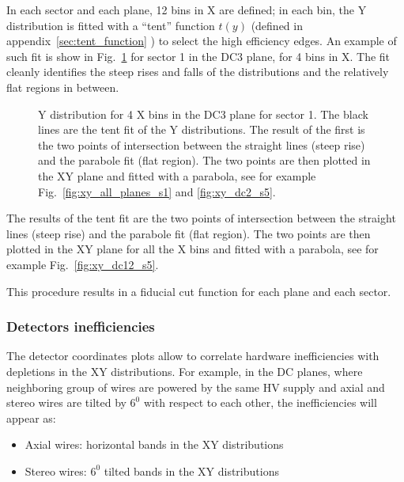 In each sector and each plane, 12 bins in X are defined; in each bin, the Y distribution
is fitted with a ``tent'' function $t(y)$ (defined in appendix~\ref{sec:tent_function} ) to select the high efficiency edges.
An example of such fit is show in Fig.~\ref{fig:y_slices_s1} for sector 1 in the DC3 plane, for 4 bins in X.
The fit cleanly identifies the steep rises and falls of the distributions and the relatively flat regions in between.

\clearpage\newpage

\begin{figure}[h]
    \centering
    \caption{Y distribution for 4 X bins in the DC3 plane for sector 1. The black lines are the tent fit of the Y distributions.
    The result of the first is the two points of intersection between the straight lines (steep rise) and the parabole fit (flat region).
    The two points are then plotted in the XY plane and fitted with a parabola, see for example Fig.~\ref{fig:xy_all_planes_s1} and \ref{fig:xy_dc2_s5}.}
    \label{fig:y_slices_s1}
\end{figure}

The results of the tent fit are the two points of intersection between the straight lines (steep rise) and the parabole fit (flat region).
The two points are then plotted in the XY plane for all the X bins and fitted with a parabola, see for example Fig.~\ref{fig:xy_dc12_s5}.

This procedure results in a fiducial cut function for each plane and each sector.


\newpage

\subsubsection{Detectors inefficiencies}
The detector coordinates plots allow to correlate hardware inefficiencies with depletions in the XY distributions.
For example, in the DC planes, where neighboring group of wires are powered by the same HV supply and
axial and stereo wires are tilted by $6^0$ with respect to each other, the inefficiencies
will appear as:

\begin{itemize}
    \item Axial wires: horizontal bands in the XY distributions
    \item Stereo wires: $6^0$ tilted bands in the XY distributions
\end{itemize}

